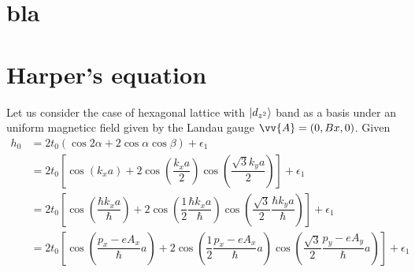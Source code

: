\documentclass{report}
\newcommand{\f}[2]{\dfrac{#1}{#2}}
\begin{document}
\nocite{*}
\renewcommand{\bibname}{REFERENCES}


\appendix
\renewcommand{\chaptername}{Appendix}
\chapter{bla}
\chapter{Harper's equation}
Let us consider the case of hexagonal lattice with $\ket{d_{z^{2}}}$ band as a basis under an uniform magneticc field given by the Landau gauge $\vv{A} = (0, Bx,0)$. Given
\begin{equation}
	\begin{aligned}
		h_0
		 & = 2 t_0 \left(\cos2\alpha + 2\cos\alpha \cos\beta\right) + \epsilon_1                                                                                                                                                                                                                                                                                                                                                                                                             \\
		 & = 2t_{0} \left[ \cos(k_x a) + 2 \cos \left(\f{k_x a}{2}\right) \cos \left(\f{\sqrt{3}k_y a}{2}\right) \right] + \epsilon_1                                                                                                                                                                                                                                                                                                                                                        \\
		 & = 2t_{0} \left[ \cos(\f{\hbar k_x a}{\hbar}) + 2 \cos \left(\f{1}{2}\f{\hbar k_x a}{\hbar}\right) \cos \left(\f{\sqrt{3}}{2}\f{\hbar k_y a}{\hbar}\right) \right] + \epsilon_1                                                                                                                                                                                                                                                                                                    \\
		 & = 2t_{0} \left[ \cos(\f{p_x - e A_x}{\hbar}a) + 2 \cos \left(\f{1}{2}\f{p_x - e A_x}{\hbar}a\right) \cos\left(\f{\sqrt{3}}{2}\f{p_y - e A_y}{\hbar}a\right) \right] + \epsilon_1                                                                                                                                                                                                                                                                                                  \\

\end{aligned}
\end{equation}
\end{document}

